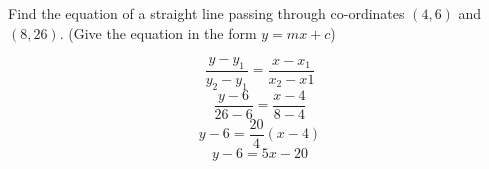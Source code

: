 \question Find the equation of a straight line passing through co-ordinates 
$(4,6)$ and $(8,26)$. (Give the equation in the form $y = mx+c$)
\begin{solution}
	\[
		\frac{y-y_{1}}{y_{2}-y_{1}} = \frac{x-x_{1}}{x_{2}-x{1}}
	\]
	\[
		\frac{y-6}{26-6} = \frac{x-4}{8-4}
	\]
	\[
		y-6 = \frac{20}{4} (x-4)
	\]
	\[
		y-6 = 5x - 20
	\]
\end{solution}

